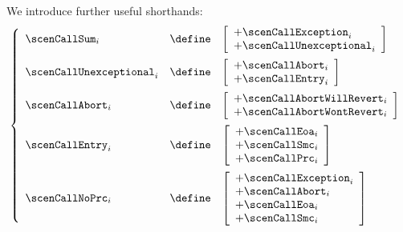 \noindent We introduce further useful shorthands:
\[
	\left\{ \begin{array}{lcl}
		\scenCallSum _{i} & \define &
		 \left[ \begin{array}{l}
			+ \scenCallException                   _{i}    \\
			+ \scenCallUnexceptional               _{i}    \\
		\end{array} \right] \vspace{2mm} \\
		\scenCallUnexceptional _{i} & \define &
		 \left[ \begin{array}{l}
			+ \scenCallAbort                       _{i}    \\
			+ \scenCallEntry                       _{i}    \\
		\end{array} \right] \vspace{2mm} \\
		\scenCallAbort _{i} & \define &
		 \left[ \begin{array}{l}
			+ \scenCallAbortWillRevert             _{i}    \\
			+ \scenCallAbortWontRevert             _{i}    \\
		\end{array} \right] \vspace{2mm} \\
		\scenCallEntry _{i} & \define &
		 \left[ \begin{array}{l}
			+ \scenCallEoa                         _{i}    \\
			+ \scenCallSmc                         _{i}    \\
			+ \scenCallPrc                         _{i}    \\
		\end{array} \right] \vspace{2mm} \\
		\scenCallNoPrc _{i} & \define &
		 \left[ \begin{array}{l}
			+ \scenCallException                   _{i}    \\
			+ \scenCallAbort                       _{i}    \\
			+ \scenCallEoa                         _{i}    \\
			+ \scenCallSmc                         _{i}    \\
		\end{array} \right] \\
	\end{array} \right. \\
\]
